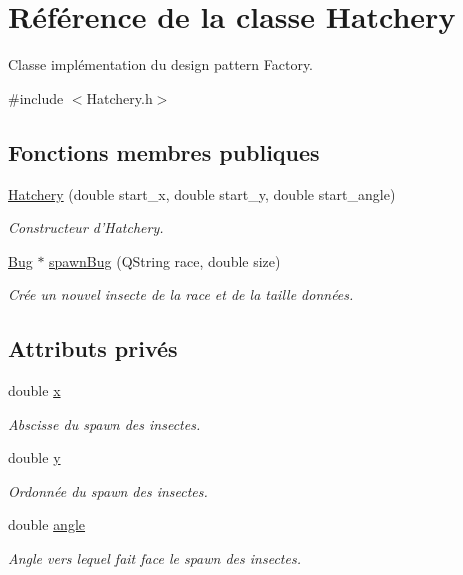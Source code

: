 \hypertarget{classHatchery}{
\section{Référence de la classe Hatchery}
\label{classHatchery}
}


Classe implémentation du design pattern Factory.  




{\ttfamily \#include $<$Hatchery.h$>$}

\subsection*{Fonctions membres publiques}
\begin{DoxyCompactItemize}
\item 
\hyperlink{classHatchery_a8e86b7578b70f37fb3f7ed2e69c765b7}{Hatchery} (double start\_\-x, double start\_\-y, double start\_\-angle)
\begin{DoxyCompactList}\small\item\em Constructeur d'Hatchery. \end{DoxyCompactList}\item 
\hyperlink{classBug}{Bug} $\ast$ \hyperlink{classHatchery_af90645b2be3e8890829a69347846a934}{spawnBug} (QString race, double size)
\begin{DoxyCompactList}\small\item\em Crée un nouvel insecte de la race et de la taille données. \end{DoxyCompactList}\end{DoxyCompactItemize}
\subsection*{Attributs privés}
\begin{DoxyCompactItemize}
\item 
double \hyperlink{classHatchery_ae56bf748a2046b42e2b174c17e4caeda}{x}
\begin{DoxyCompactList}\small\item\em Abscisse du spawn des insectes. \end{DoxyCompactList}\item 
double \hyperlink{classHatchery_a99f0ef4a290d0bc1e65976b5979b29b7}{y}
\begin{DoxyCompactList}\small\item\em Ordonnée du spawn des insectes. \end{DoxyCompactList}\item 
double \hyperlink{classHatchery_a4e56c9314b9a9dfe1718d43e30f3d4d0}{angle}
\begin{DoxyCompactList}\small\item\em Angle vers lequel fait face le spawn des insectes. \end{DoxyCompactList}\end{DoxyCompactItemize}


